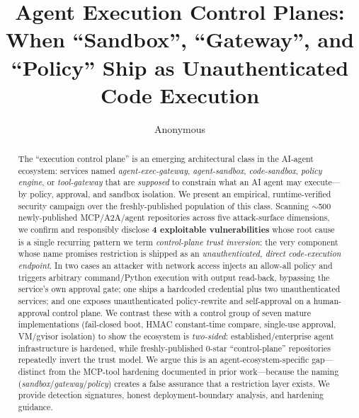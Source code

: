 \documentclass{llncs}
\begin{document}
\title{Agent Execution Control Planes: When ``Sandbox'', ``Gateway'', and ``Policy'' Ship as Unauthenticated Code Execution}

\author{Anonymous}

\maketitle

\begin{abstract}
The ``execution control plane'' is an emerging architectural class in the AI-agent ecosystem: services named \emph{agent-exec-gateway}, \emph{agent-sandbox}, \emph{code-sandbox}, \emph{policy engine}, or \emph{tool-gateway} that are \emph{supposed} to constrain what an AI agent may execute---by policy, approval, and sandbox isolation. We present an empirical, runtime-verified security campaign over the freshly-published population of this class. Scanning $\sim$500 newly-published MCP/A2A/agent repositories across five attack-surface dimensions, we confirm and responsibly disclose \textbf{4 exploitable vulnerabilities} whose root cause is a single recurring pattern we term \emph{control-plane trust inversion}: the very component whose name promises restriction is shipped as an \emph{unauthenticated, direct code-execution endpoint}. In two cases an attacker with network access injects an allow-all policy and triggers arbitrary command/Python execution with output read-back, bypassing the service's own approval gate; one ships a hardcoded credential plus two unauthenticated services; and one exposes unauthenticated policy-rewrite and self-approval on a human-approval control plane. We contrast these with a control group of seven mature implementations (fail-closed boot, HMAC constant-time compare, single-use approval, VM/gvisor isolation) to show the ecosystem is \emph{two-sided}: established/enterprise agent infrastructure is hardened, while freshly-published 0-star ``control-plane'' repositories repeatedly invert the trust model. We argue this is an agent-ecosystem-specific gap---distinct from the MCP-tool hardening documented in prior work---because the naming (\emph{sandbox}/\emph{gateway}/\emph{policy}) creates a false assurance that a restriction layer exists. We provide detection signatures, honest deployment-boundary analysis, and hardening guidance.
\end{abstract}

\end{document}
